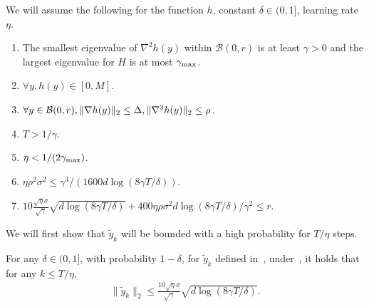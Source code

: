 \begin{assumption}[Regularity of $h$]
\label{assum:regular}
We will assume the following for the function $h$, constant $\delta \in (0,1]$, learning rate $\eta$.
    \begin{enumerate}
        \item The smallest eigenvalue of $\nabla^2 h(y)$ within $\mathcal{B}(0,r)$ is at least $\gamma > 0$ and the largest eigenvalue for $H$ is at most $\gamma_{\mathrm{max}}$.
        \item $\forall y, h(y) \in [0, M]$.
        \item  $\forall y \in \mathcal{B}(0,r), \| \nabla h(y) \|_2 \le \Delta, \| \nabla^3 h(y) \|_2 \le \rho$.
        \item $T > 1 / \gamma$.
        \item $\eta < 1/(2\gamma_{\mathrm{max}})$.
        \item $\eta \rho^2 \sigma^2 \le {\gamma^3}/{(1600  d \log(8\gamma T/\delta))}$.
        \item $10\frac{\sqrt{\eta} \sigma}{\sqrt{\gamma}} \sqrt{d \log(8 \gamma T / \delta)} + 400 \eta \rho \sigma^2 d \log(8 \gamma T / \delta) / \gamma^2 \le r$.
    \end{enumerate}
\end{assumption}



We will first show that $\tilde y_k$ will be bounded with a high probability for $T/\eta$ steps.

\begin{lemma}
\label{lem:normboundsgd}
    For any $\delta \in (0,1]$, with probability $1 - \delta$, for $\tilde y_k$ defined in~, under~, it holds that for any $k \le T/\eta$, 
    \begin{align*}
   \| \tilde y_k \|_2 \le \frac{10 \sqrt{\eta} \sigma}{\sqrt{\gamma}} \sqrt{d \log(8\gamma T/\delta)}.
    \end{align*}
\end{lemma}

